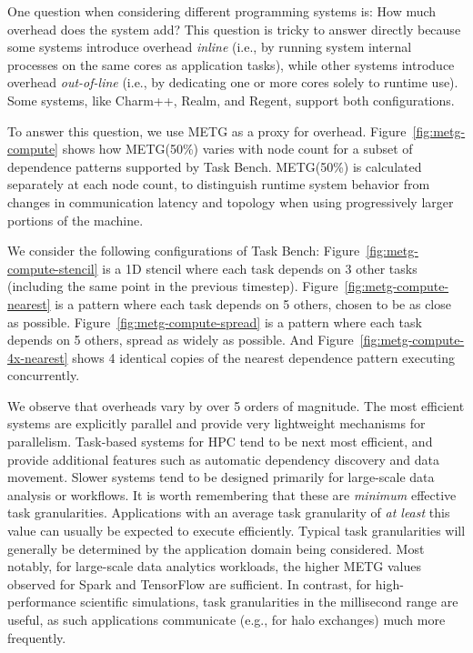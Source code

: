 One question when considering different programming
systems is: How much overhead does the system add? This question is tricky to answer directly because some systems introduce
overhead \emph{inline} (i.e., by running system internal processes on
the same cores as application tasks), while other systems introduce
overhead \emph{out-of-line} (i.e., by dedicating one or more cores
solely to runtime use). Some systems, like Charm++, Realm, and Regent,
support both configurations.

To answer this question, we use METG %
as a proxy for overhead. Figure~\ref{fig:metg-compute}
shows how METG(50\%) varies with node count for a subset of
dependence patterns supported by Task Bench. METG(50\%) is calculated
separately at each node count, to distinguish runtime system behavior from
changes in communication latency and topology when using
progressively larger portions of the machine.

We consider the following configurations of Task Bench:
Figure~\ref{fig:metg-compute-stencil} is a 1D stencil where each task
depends on 3 other tasks (including the same point in the previous
timestep). Figure~\ref{fig:metg-compute-nearest} is a pattern where
each task depends on 5 others, chosen to be as close as
possible. Figure~\ref{fig:metg-compute-spread} is a pattern where each
task depends on 5 others, spread as widely as possible. And
Figure~\ref{fig:metg-compute-4x-nearest} shows 4 identical copies of
the nearest dependence pattern executing concurrently.

We observe that overheads vary by over 5 orders of
magnitude. {\color{blue} The most efficient systems are explicitly parallel
and provide very lightweight mechanisms for parallelism. Task-based systems for HPC tend to be next most efficient, and
provide additional features such as automatic dependency discovery and
data movement. Slower systems tend to be designed primarily for
large-scale data analysis or workflows.} It is worth
remembering that these are \emph{minimum}
effective task granularities. Applications with an average
task granularity of \emph{at least} this value can usually be expected
to execute efficiently. Typical task granularities will
generally be determined by the application domain being
considered. Most notably, for large-scale data analytics workloads, the higher METG values observed for Spark and
TensorFlow are sufficient. In contrast, for high-performance
scientific simulations, task granularities in the millisecond range
are useful, as such applications communicate (e.g., for halo
exchanges) much more frequently.

